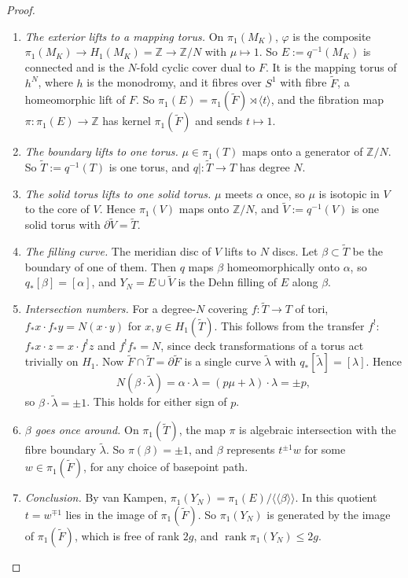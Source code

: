 \documentclass[11pt]{article}
\theoremstyle{definition}
\newcommand{\Z}{\mathbb{Z}}
\newcommand{\rk}{\operatorname{rank}}
\begin{document}
\begin{proof}
\begin{enumerate}[leftmargin=*]
\item \emph{The exterior lifts to a mapping torus.} On $\pi_1(M_K)$, $\varphi$ is the composite $\pi_1(M_K)\to H_1(M_K)=\Z\to\Z/N$ with $\mu\mapsto1$. So $E:=q^{-1}(M_K)$ is connected and is the $N$-fold cyclic cover dual to $F$. It is the mapping torus of $h^N$, where $h$ is the monodromy, and it fibres over $S^1$ with fibre $\tilde F$, a homeomorphic lift of $F$. So $\pi_1(E)=\pi_1(\tilde F)\rtimes\langle t\rangle$, and the fibration map $\pi\colon\pi_1(E)\to\Z$ has kernel $\pi_1(\tilde F)$ and sends $t\mapsto1$.
\item \emph{The boundary lifts to one torus.} $\mu\in\pi_1(T)$ maps onto a generator of $\Z/N$. So $\tilde T:=q^{-1}(T)$ is one torus, and $q|\colon\tilde T\to T$ has degree $N$.
\item \emph{The solid torus lifts to one solid torus.} $\mu$ meets $\alpha$ once, so $\mu$ is isotopic in $V$ to the core of $V$. Hence $\pi_1(V)$ maps onto $\Z/N$, and $\tilde V:=q^{-1}(V)$ is one solid torus with $\partial\tilde V=\tilde T$.
\item \emph{The filling curve.} The meridian disc of $V$ lifts to $N$ discs. Let $\beta\subset\tilde T$ be the boundary of one of them. Then $q$ maps $\beta$ homeomorphically onto $\alpha$, so $q_*[\beta]=[\alpha]$, and $Y_N=E\cup\tilde V$ is the Dehn filling of $E$ along $\beta$.
\item \emph{Intersection numbers.} For a degree-$N$ covering $f\colon\tilde T\to T$ of tori, $f_*x\cdot f_*y=N(x\cdot y)$ for $x,y\in H_1(\tilde T)$. This follows from the transfer $f^!$: $f_*x\cdot z=x\cdot f^!z$ and $f^!f_*=N$, since deck transformations of a torus act trivially on $H_1$. Now $\tilde F\cap\tilde T=\partial\tilde F$ is a single curve $\tilde\lambda$ with $q_*[\tilde\lambda]=[\lambda]$. Hence
\[
N(\beta\cdot\tilde\lambda)=\alpha\cdot\lambda=(p\mu+\lambda)\cdot\lambda=\pm p,
\]
so $\beta\cdot\tilde\lambda=\pm1$. This holds for either sign of $p$.
\item \emph{$\beta$ goes once around.} On $\pi_1(\tilde T)$, the map $\pi$ is algebraic intersection with the fibre boundary $\tilde\lambda$. So $\pi(\beta)=\pm1$, and $\beta$ represents $t^{\pm1}w$ for some $w\in\pi_1(\tilde F)$, for any choice of basepoint path.
\item \emph{Conclusion.} By van Kampen, $\pi_1(Y_N)=\pi_1(E)/\langle\!\langle\beta\rangle\!\rangle$. In this quotient $t=w^{\mp1}$ lies in the image of $\pi_1(\tilde F)$. So $\pi_1(Y_N)$ is generated by the image of $\pi_1(\tilde F)$, which is free of rank $2g$, and $\rk\pi_1(Y_N)\le2g$.\qedhere
\end{enumerate}
\end{proof}
\end{document}
